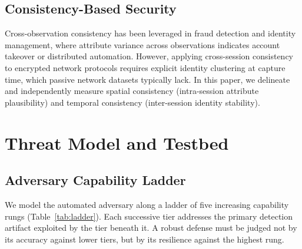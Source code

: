 \documentclass[conference]{IEEEtran}
\begin{document}
\subsection{Consistency-Based Security}
Cross-observation consistency has been leveraged in fraud detection and identity management, where attribute variance across observations indicates account takeover or distributed automation. However, applying cross-session consistency to encrypted network protocols requires explicit identity clustering at capture time, which passive network datasets typically lack. In this paper, we delineate and independently measure spatial consistency (intra-session attribute plausibility) and temporal consistency (inter-session identity stability).

\section{Threat Model and Testbed}

\subsection{Adversary Capability Ladder}
We model the automated adversary along a ladder of five increasing capability rungs (Table~\ref{tab:ladder}). Each successive tier addresses the primary detection artifact exploited by the tier beneath it. A robust defense must be judged not by its accuracy against lower tiers, but by its resilience against the highest rung.

\begin{table}[t]
\caption{Adversary Capability Ladder}
\label{tab:ladder}
\centering
{}
\end{table}
\end{document}
